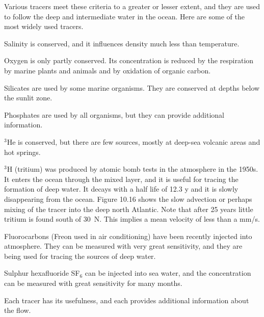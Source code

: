 Various tracers meet these criteria to a greater or lesser extent, and
they are used to follow the deep and intermediate water in the
ocean. Here are some of the most widely used tracers.
\begin{enumerate}
\vitem Salinity is conserved, and it influences density much less than
temperature.

\vitem Oxygen is only partly conserved. Its concentration is reduced
by the respiration by marine plants and animals and by oxidation of
organic carbon.

\vitem Silicates are used by some marine organisms. They are conserved
at depths below the sunlit zone.

\vitem Phosphates are used by all organisms, but they can provide
additional information.

\vitem $^3$He is conserved, but there are few sources, mostly at
deep-sea volcanic areas and hot springs.

\vitem $^3$H (tritium) was produced by atomic bomb tests in the
atmosphere in the 1950s. It enters the ocean through the mixed
layer, and it is useful for tracing the formation
of deep water. It decays with a half life of 12.3 y and it is slowly
disappearing from the ocean. Figure 10.16 shows the slow advection or
perhaps mixing of the tracer into the deep
north Atlantic. Note that after 25 years little tritium is found south
of 30\degrees\ N. This implies a mean velocity of less than a mm/s.

\vitem Fluorocarbons (Freon used in air conditioning) have been
recently injected into atmosphere. They can be measured with very
great sensitivity, and they are being used for tracing the sources of
deep water.

\vitem Sulphur hexafluoride SF$_6$ can be injected into sea water, and
the concentration can be measured with great sensitivity for many
months.
\end{enumerate}
Each tracer has its usefulness, and each provides additional
information about the flow.

